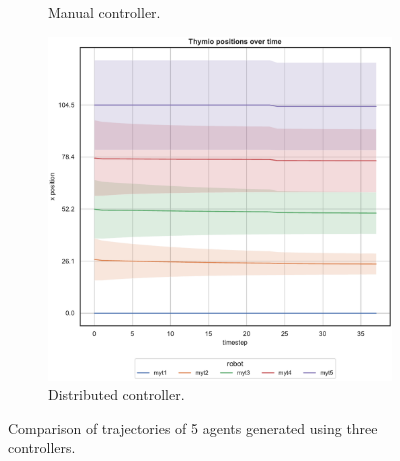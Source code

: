 \begin{figure}[!htb]
\begin{center}
\begin{subfigure}[h]{0.325\textwidth}
			\caption{Manual controller.}
		\end{subfigure}
		\hfill
		\begin{subfigure}[h]{0.325\textwidth}
			\centering
			\includegraphics[width=\textwidth]{contents/images/net-d18/N5/position-overtime-distributed}
			\caption{Distributed controller.}
		\end{subfigure}
	\end{center}
	\caption[Evaluation of the trajectories learned by \texttt{net-d18} using 5 
	agents.]{Comparison of trajectories of 5 agents generated using three 
		controllers.}
	\label{fig:net-d18traj5}
\end{figure}
